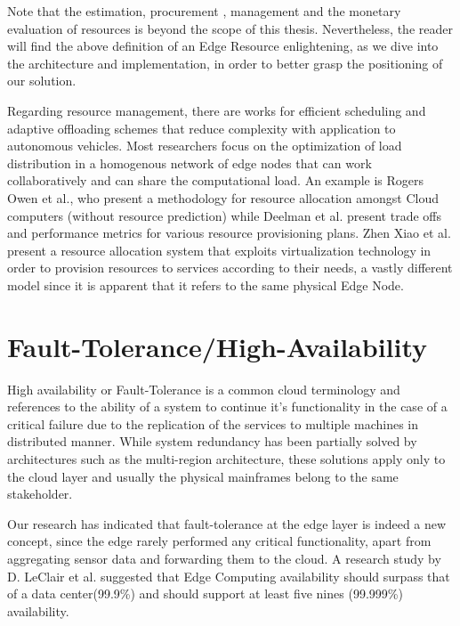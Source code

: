 Note that the estimation, procurement , management and the monetary evaluation of resources is beyond the scope of this thesis. Nevertheless, the reader will find the above definition of an Edge Resource enlightening, as we dive into the architecture and implementation, in order to better grasp the positioning of our solution. 

Regarding resource management, there are works for efficient scheduling and adaptive offloading schemes that reduce complexity\cite{feng2017ave} with application to autonomous vehicles. Most researchers focus on the optimization of load distribution in a homogenous network of edge nodes that can work collaboratively and  can share the computational load. An example is Rogers Owen et al.\cite{rogers2012financial}, who present a methodology for resource allocation amongst Cloud computers (without resource prediction) while Deelman et al. present trade offs and performance metrics for various resource provisioning plans.  Zhen Xiao et al.\cite{xiao2012dynamic} present a resource allocation system that exploits virtualization technology in order to provision resources to services according to their needs, a vastly different model since it is apparent that it refers to the same physical Edge Node.

\section{ Fault-Tolerance/High-Availability}

High availability or Fault-Tolerance is a common cloud terminology and references to the ability of a system to continue it’s functionality in the case of a critical failure due to the replication of the services to multiple machines in distributed manner. While system redundancy has been partially solved by architectures such as the multi-region architecture, these solutions apply only to the cloud layer and usually the physical mainframes belong to the same stakeholder.

Our research has indicated that fault-tolerance at the edge layer is indeed a new concept, since the edge rarely performed any critical functionality, apart from aggregating sensor data and forwarding them to the cloud. A research study by D. LeClair et al. suggested that Edge Computing availability should surpass that of a data center(99.9\%) and should support at least five nines (99.999\%) availability\cite{ismail2015evaluation}.

